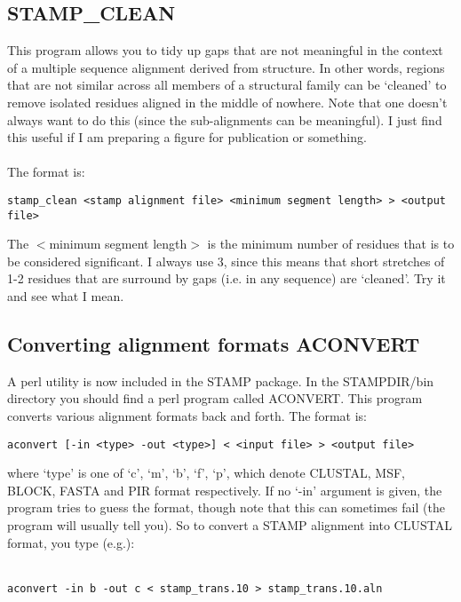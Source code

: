 \subsection{STAMP\_CLEAN}

This program allows you to tidy up gaps that are not meaningful in the context
of a multiple sequence alignment derived from structure.  In other words, regions
that are not similar across all members of a structural family can be `cleaned' to
remove isolated residues aligned in the middle of nowhere.  Note that one doesn't always 
want  to do this (since the sub-alignments can be meaningful).  I just find this
useful if I am preparing a figure for publication or something.\\
\\
The format is:

\begin{scriptsize}\begin{verbatim}
stamp_clean <stamp alignment file> <minimum segment length> > <output file>
\end{verbatim} \end{scriptsize}

The $<$minimum segment length$>$ is the minimum number of residues that is to
be considered significant.  I always use 3, since this means that short stretches of
1-2 residues that are surround by gaps (i.e. in any sequence) are `cleaned'.  Try it 
and see what I mean.

\subsection{Converting alignment formats ACONVERT}

A perl utility is now included in the STAMP package.  In the STAMPDIR/bin directory you
should find a perl program called ACONVERT.  This program converts various alignment formats
back and forth.  The format is:

\begin{scriptsize}\begin{verbatim}
aconvert [-in <type> -out <type>] < <input file> > <output file>
\end{verbatim} \end{scriptsize}

where `type' is one of `c', `m', `b', `f', `p', which denote CLUSTAL, MSF, BLOCK,
FASTA and PIR format respectively.  If no `-in' argument is given, the program tries
to guess the format, though note that this can sometimes fail (the program will usually
tell you).  So to convert a STAMP alignment into CLUSTAL format, you type (e.g.):\\
\\
\begin{scriptsize}\begin{verbatim}
aconvert -in b -out c < stamp_trans.10 > stamp_trans.10.aln
\end{verbatim} \end{scriptsize}


